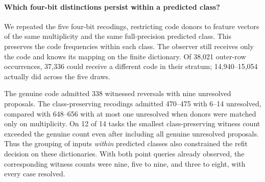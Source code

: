 \paragraph{Which four-bit distinctions persist within a predicted class?}
We repeated the five four-bit recodings, restricting code donors to feature vectors of the same multiplicity and the same full-precision predicted class. This preserves the code frequencies within each class. The observer still receives only the code and knows its mapping on the finite dictionary. Of 38,021 outer-row occurrences, 37,336 could receive a different code in their stratum; 14,940--15,054 actually did across the five draws.

The genuine code admitted 338 witnessed reversals with nine unresolved proposals. The class-preserving recodings admitted 470--475 with 6--14 unresolved, compared with 648--656 with at most one unresolved when donors were matched only on multiplicity. On 12 of 14 tasks the smallest class-preserving witness count exceeded the genuine count even after including all genuine unresolved proposals. Thus the grouping of inputs \emph{within} predicted classes also constrained the refit decision on these dictionaries. With both point queries already observed, the corresponding witness counts were nine, five to nine, and three to eight, with every case resolved.
